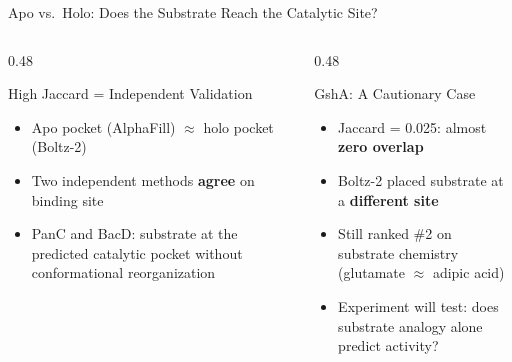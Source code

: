 \documentclass[aspectratio=169, 11pt]{beamer}
\begin{document}
\begin{frame}{Apo vs.\ Holo: Does the Substrate Reach the Catalytic Site?}
\vspace{4pt}
\begin{columns}[T]
\begin{column}{0.48\textwidth}
\begin{exampleblock}{High Jaccard = Independent Validation}
\begin{itemize}\small
\item Apo pocket (AlphaFill) $\approx$ holo pocket (Boltz-2)
\item Two independent methods \textbf{agree} on binding site
\item PanC and BacD: substrate at the predicted catalytic pocket without conformational reorganization
\end{itemize}
\end{exampleblock}
\end{column}
\begin{column}{0.48\textwidth}
\begin{alertblock}{GshA: A Cautionary Case}
\begin{itemize}\small
\item Jaccard = 0.025: almost \textbf{zero overlap}
\item Boltz-2 placed substrate at a \textbf{different site}
\item Still ranked \#2 on substrate chemistry\\(glutamate $\approx$ adipic acid)
\item Experiment will test: does substrate analogy alone predict activity?
\end{itemize}
\end{alertblock}
\end{column}
\end{columns}
\end{frame}
\end{document}
